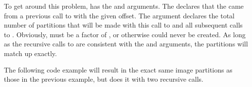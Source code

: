 To get around this problem,  has the
 and  arguments.
The  declares that the  came from a
previous call to  with the given offset.  The
 argument declares the total number of
partitions that will be made with this call to 
and all subsequent calls to .  Obviously,
 must be a factor of
, or otherwise
 could never be created.  As long as the
recursive calls to  are consistent with the
 and  arguments,
the partitions will match up exactly.

The following code example will result in the exact same image partitions
as those in the previous example, but does it with two recursive calls.

